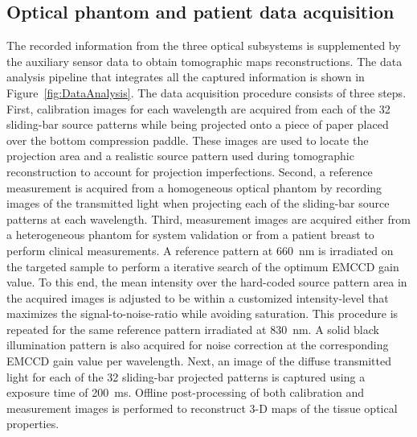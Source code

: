 \subsection{Optical phantom and patient data acquisition}
\label{Sec:DataAcquisition}
The recorded information from the three optical subsystems is supplemented by the auxiliary sensor data to obtain tomographic maps reconstructions. The data analysis pipeline that integrates all the captured information is shown in Figure~\ref{fig:DataAnalysis}. The data acquisition procedure consists of three steps. First, calibration images for each wavelength are acquired from each of the 32 sliding-bar source patterns while being projected onto a piece of paper placed over the bottom compression paddle. These images are used to locate the projection area and a realistic source pattern used during tomographic reconstruction to account for projection imperfections. Second, a reference measurement is acquired from a homogeneous optical phantom by recording images of the transmitted light when projecting each of the sliding-bar source patterns at each wavelength. Third, measurement images are acquired either from a heterogeneous phantom for system validation or from a patient breast to perform clinical measurements. A reference pattern at 660~nm is irradiated on the targeted sample to perform a iterative search of the optimum EMCCD gain value. To this end, the mean intensity over the hard-coded source pattern area in the acquired images is adjusted to be within a customized intensity-level that maximizes the signal-to-noise-ratio while avoiding saturation. This procedure is repeated for the same reference pattern irradiated at 830~nm. A solid black illumination pattern is also acquired for noise correction at the corresponding EMCCD gain value per wavelength. Next, an image of the diffuse transmitted light for each of the 32 sliding-bar projected patterns is captured using a exposure time of 200~ms. Offline post-processing of both calibration and measurement images is performed to reconstruct 3-D maps of the tissue optical properties.

